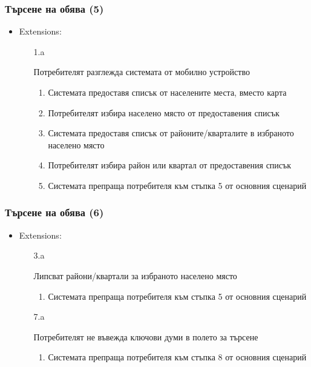 \documentclass[12pt]{beamer}
\begin{document}
\begin{frame}[fragile]
\frametitle{Търсене на обява (5)}
\begin{itemize}
	\item {Extensions:
		\begin{itemize}
        \item[1.a] {Потребителят разглежда системата от мобилно устройство
                \begin{enumerate}[1.]
                \item Системата предоставя списък от населените места, вместо карта
                \item Потребителят избира населено място от предоставения списък
                \item Системата предоставя списък от районите/кварталите в избраното населено място
                \item Потребителят избира район или квартал от предоставения списък
                \item Системата препраща потребителя към стъпка 5 от основния сценарий
                \end{enumerate}
        }
		\end{itemize}
	} 
\end{itemize}
\end{frame}

\begin{frame}[fragile]
\frametitle{Търсене на обява (6)}
\begin{itemize}
	\item {Extensions:
		\begin{itemize}
        \item[3.a] {Липсват райони/квартали за избраното населено място
                \begin{enumerate}[1.]
                \item Системата препраща потребителя към стъпка 5 от основния сценарий
                \end{enumerate}
		}
        \item[7.a] {Потребителят не въвежда ключови думи в полето за търсене
                \begin{enumerate}[1.]
                \item Системата препраща потребителя към стъпка 8 от основния сценарий
                \end{enumerate}
        }
		\end{itemize}
	} 
\end{itemize}
\end{frame}
\end{document}
